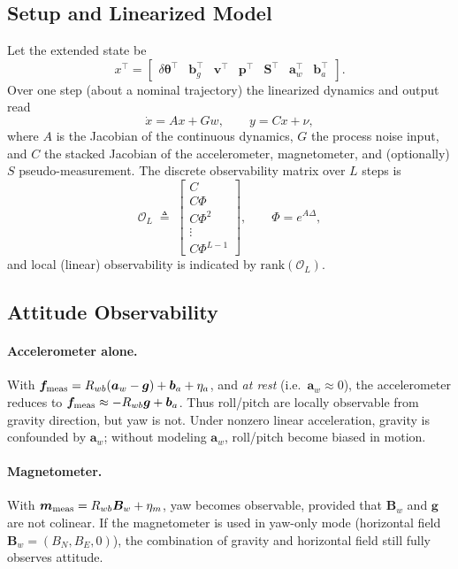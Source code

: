 \documentclass[10pt]{extarticle}
\begin{document}
\subsection{Setup and Linearized Model}
Let the extended state be
\[
x^\top=\begin{bmatrix}
\delta\bm\theta^\top & \bm b_g^\top & \bm v^\top & \bm p^\top & \bm S^\top & \bm a_w^\top & \bm b_a^\top
\end{bmatrix}.
\]
Over one step (about a nominal trajectory) the linearized dynamics and output read
\begin{equation}
\dot x = A x + G w,
\qquad
y = C x + \nu,
\label{eq:lin-obs}
\end{equation}
where $A$ is the Jacobian of the continuous dynamics, $G$ the process noise input, and
$C$ the stacked Jacobian of the accelerometer, magnetometer, and (optionally) $S$ pseudo-measurement.
The discrete observability matrix over $L$ steps is
\begin{equation}
\mathcal{O}_L \;\triangleq\; \begin{bmatrix}
C\\
C\Phi\\
C\Phi^2\\
\vdots\\
C\Phi^{L-1}
\end{bmatrix},
\qquad
\Phi = e^{A\Delta},
\label{eq:obs-matrix}
\end{equation}
and local (linear) observability is indicated by $\mathrm{rank}(\mathcal{O}_L)$.

\subsection{Attitude Observability}
\paragraph{Accelerometer alone.} With $\bm f_{\rm meas}=R_{wb}(\bm a_w-\bm g)+\bm b_a+\eta_a$,
and \emph{at rest} (i.e.\ $\bm a_w\approx 0$), the accelerometer reduces to
$\bm f_{\rm meas}\approx -R_{wb}\bm g+\bm b_a$. Thus roll/pitch are locally observable
from gravity direction, but yaw is not. Under nonzero linear acceleration, gravity is
confounded by $\bm a_w$; without modeling $\bm a_w$, roll/pitch become biased in motion.

\paragraph{Magnetometer.} With $\bm m_{\rm meas}=R_{wb}\bm B_w+\eta_m$, yaw becomes observable,
provided that $\bm B_w$ and $\bm g$ are not colinear. If the magnetometer is used in
yaw-only mode (horizontal field $\bm B_w=(B_N,B_E,0)$), the combination of gravity and
horizontal field still fully observes attitude.
\end{document}
